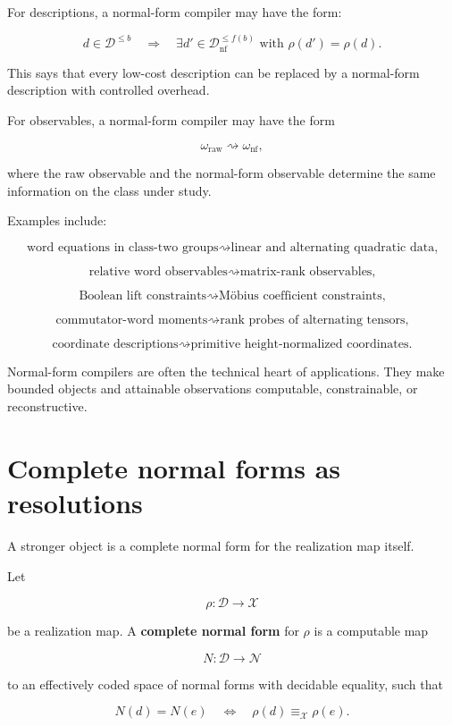 \documentclass[11pt]{article}
\begin{document}
For descriptions, a normal-form compiler may have the form:

\[
d\in\mathcal D^{\leq b}
\quad\Longrightarrow\quad
\exists d'\in\mathcal D_{\mathrm{nf}}^{\leq f(b)}
\text{ with }
\rho(d')=\rho(d).
\]

This says that every low-cost description can be replaced by a normal-form description with controlled overhead.

For observables, a normal-form compiler may have the form

\[
\omega_{\mathrm{raw}}
\rightsquigarrow
\omega_{\mathrm{nf}},
\]

where the raw observable and the normal-form observable determine the same information on the class under study.

Examples include:

\[
\text{word equations in class-two groups}
\rightsquigarrow
\text{linear and alternating quadratic data,}
\]

\[
\text{relative word observables}
\rightsquigarrow
\text{matrix-rank observables,}
\]

\[
\text{Boolean lift constraints}
\rightsquigarrow
\text{Möbius coefficient constraints,}
\]

\[
\text{commutator-word moments}
\rightsquigarrow
\text{rank probes of alternating tensors,}
\]

\[
\text{coordinate descriptions}
\rightsquigarrow
\text{primitive height-normalized coordinates.}
\]

Normal-form compilers are often the technical heart of applications. They make bounded objects and attainable observations computable, constrainable, or reconstructive.


\section{Complete normal forms as resolutions}

A stronger object is a complete normal form for the realization map itself.

Let

\[
\rho:\mathcal D\to\mathcal X
\]

be a realization map. A \textbf{complete normal form} for \(\rho\) is a computable map

\[
N:\mathcal D\to\mathcal N
\]

to an effectively coded space of normal forms with decidable equality, such that

\[
N(d)=N(e)
\quad\Longleftrightarrow\quad
\rho(d)\equiv_\mathcal X\rho(e).
\]
\end{document}
